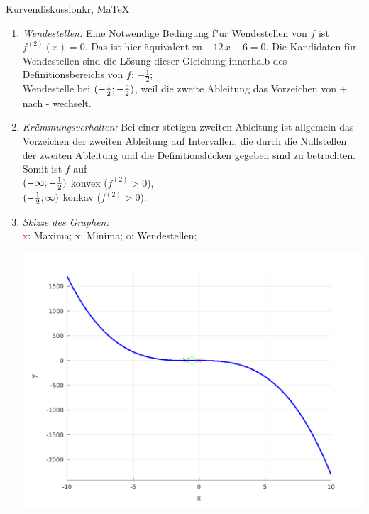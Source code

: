 \begin{MAufgabe}{Kurvendiskussion}{kr, MaTeX}
\begin{enumerate}
 $\MoIl-1\MIntvlSep0\MoIr$ monoton  wachsend, \\ 
 $\MoIl0\MIntvlSep \infty\MoIr$ monoton fallend. \\ 
 \item \emph{Wendestellen:} 
 Eine Notwendige Bedingung f"ur Wendestellen von $f$ ist $f^{(2)}(x)=0$. 
 Das ist hier \"aquivalent zu $ - 12\, x - 6=0$. 
 Die Kandidaten f\"ur Wendestellen sind die L\"osung dieser Gleichung innerhalb des Definitionsbereichs von $f$: $- \frac{1}{2}$; \\ 
 Wendestelle bei $(- \frac{1}{2};- \frac{5}{2})$, weil die zweite Ableitung das Vorzeichen von + nach - wechselt. \\ 
 \item \emph{Kr\"ummungsverhalten:} 
 Bei einer stetigen zweiten Ableitung ist allgemein das Vorzeichen der zweiten Ableitung auf Intervallen, die durch die Nullstellen der zweiten Ableitung und die Definitionsl\"ucken gegeben sind zu betrachten. 
 Somit ist $f$ auf \\ 
 $(-\infty ;- \frac{1}{2})$  konvex ($f^{(2)}>0$), \\ 
 $(- \frac{1}{2}; \infty)$  konkav ($f^{(2)}>0$). \\ 
 \item \emph{Skizze des Graphen:} \\ 
 {\textcolor{red} x}: Maxima; {\textcolor{black} x}: Minima; {\textcolor{green} o}: Wendestellen; 
  \begin{center}
  \includegraphics[width=0.8\linewidth]{Abb_zur_Ag_autogenerated_fractions_38.png} \end{center}
  
 \end{enumerate}
 \else\relax\fi
  \end{MAufgabe}
